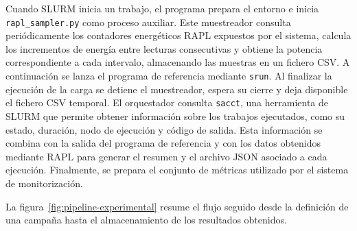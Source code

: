 Cuando SLURM inicia un trabajo, el programa prepara el entorno e inicia \texttt{rapl\_sampler.py} como proceso auxiliar. Este muestreador consulta periódicamente los contadores energéticos RAPL expuestos por el sistema, calcula los incrementos de energía entre lecturas consecutivas y obtiene la potencia correspondiente a cada intervalo, almacenando las muestras en un fichero CSV. A continuación se lanza el programa de referencia mediante \texttt{srun}. Al finalizar la ejecución de la carga se detiene el muestreador, espera su cierre y deja disponible el fichero CSV temporal. El orquestador consulta \texttt{sacct}, una herramienta de SLURM que permite obtener información sobre los trabajos ejecutados, como su estado, duración, nodo de ejecución y código de salida. Esta información se combina con la salida del programa de referencia y con los datos obtenidos mediante RAPL para generar el resumen y el archivo JSON asociado a cada ejecución. Finalmente, se prepara el conjunto de métricas utilizado por el sistema de monitorización.

La figura~\ref{fig:pipeline-experimental} resume el flujo seguido desde la definición
de una campaña hasta el almacenamiento de los resultados obtenidos.

